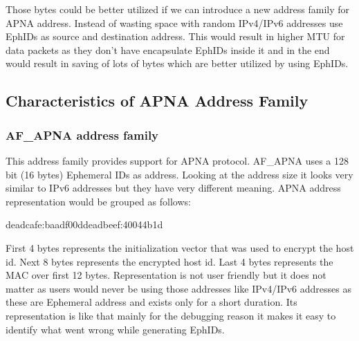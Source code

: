 Those bytes could be better utilized if we can introduce a new address family for APNA address. Instead of wasting space with random IPv4/IPv6 addresses use EphIDs as source and destination address. This would result in higher MTU for data packets as they don't have encapsulate EphIDs inside it and in the end would result in saving of lots of bytes which are better utilized by using EphIDs.

\subsection{Characteristics of APNA Address Family}
\subsubsection{AF\_APNA address family}
This address family provides support for APNA protocol. AF\_APNA uses a 128 bit (16 bytes) Ephemeral IDs as address. Looking at the address size it looks very similar to IPv6 addresses but they have very different meaning. APNA address representation would be grouped as follows:
\begin{center}
deadcafe:baadf00ddeadbeef:40044b1d
\end{center}
First 4 bytes represents the initialization vector that was used to encrypt the host id. Next 8 bytes represents the encrypted host id. Last 4 bytes represents the MAC over first 12 bytes. Representation is not user friendly but it does not matter as users would never be using those addresses like IPv4/IPv6 addresses as these are Ephemeral address and exists only for a short duration. Its representation is like that mainly for the debugging reason it makes it easy to identify what went wrong while generating EphIDs.

